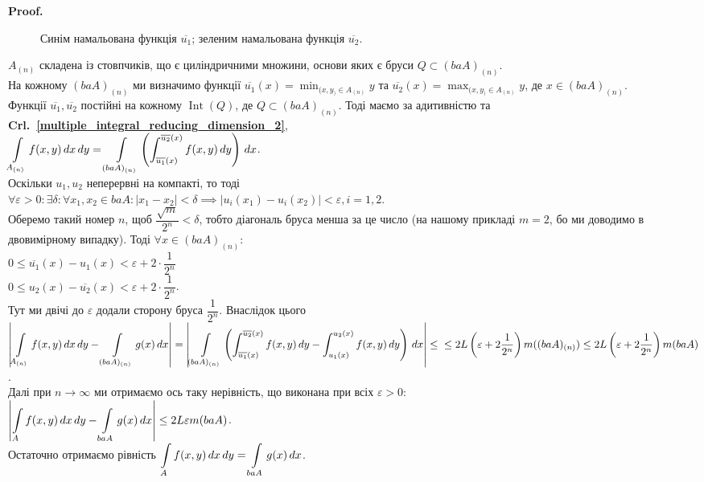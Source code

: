 \documentclass[a4paper, 10pt]{article}
\makeatletter
\def\qed{$\blacksquare$}
\theoremstyle{theoremdd}
\theoremstyle{theoremdd}
\theoremstyle{theoremdd}
\theoremstyle{theoremdd}
\theoremstyle{theoremdd}
\theoremstyle{theoremdd}
\theoremstyle{theoremdd}
\theoremstyle{theoremdd}
\renewenvironment{proof}[1][Proof.\\]{\par
\pushQED{\hfill \qed}%
\normalfont \topsep6\p@\@plus6\p@\relax
\trivlist
\item\relax
{\bfseries
#1\@addpunct{.}}\hspace\labelsep\ignorespaces
}{%
\popQED\endtrivlist\@endpefalse
}
\DeclareMathOperator{\Int}{Int}
\newcommand\crlref[1]{\textbf{Crl.~\ref{#1}}}
\makeatother
\begin{document}
\begin{proof}
\begin{figure}[H]
\caption*{Синім намальована функція $\overline{u_1}$; зеленим намальована функція $\overline{u_2}$.}
\end{figure}
$A_{(n)}$ складена із стовпчиків, що є циліндричними множини, основи яких є бруси $Q \subset (baA)_{(n)}$.\\
На кожному $(baA)_{(n)}$ ми визначимо функції $\overline{u_1}(x) = \displaystyle\min_{(x,y_) \in A_{(n)}} y$ та $\overline{u_2}(x) = \displaystyle\max_{(x,y_) \in A_{(n)}} y$, де $x \in (baA)_{(n)}$.\\
Функції $\overline{u_1}, \overline{u_2}$ постійні на кожному $\Int(Q)$, де $Q \subset (baA)_{(n)}$. Тоді маємо за адитивністю та \crlref{multiple_integral_reducing_dimension_2},\\
$\displaystyle\int\displaylimits_{A_{(n)}} f(x,y)\,dx\,dy = \int\displaylimits_{(baA)_{(n)}} \left(\int_{\overline{u_1}(x)}^{\overline{u_2}(x)} f(x,y)\,dy \right)\,dx$.\\
Оскільки $u_1,u_2$ неперервні на компакті, то тоді\\
$\forall \varepsilon > 0: \exists \delta: \forall x_1,x_2 \in baA: |x_1-x_2| < \delta \implies |u_i(x_1)-u_i(x_2)| < \varepsilon, i =1,2$.\\
Оберемо такий номер $n$, щоб $\dfrac{\sqrt{m}}{2^n} < \delta$, тобто діагональ бруса менша за це число (на нашому прикладі $m =2$, бо ми доводимо в двовимірному випадку). Тоді $\forall x \in (baA)_{(n)}:$\\
$0 \leq \overline{u_1}(x) - u_1(x) < \varepsilon + 2 \cdot \dfrac{1}{2^n}$\\
$0 \leq u_2(x) - \overline{u_2}(x) < \varepsilon + 2 \cdot \dfrac{1}{2^n}$.\\
Тут ми двічі до $\varepsilon$ додали сторону бруса $\dfrac{1}{2^n}$. Внаслідок цього\\
$\displaystyle\abs{\int\displaylimits_{A_{(n)}} f(x,y)\,dx\,dy - \int\displaylimits_{(baA)_{(n)}} g(x)\,dx} = \abs{\int\displaylimits_{(baA)_{(n)}} \left(\int_{\overline{u_1}(x)}^{\overline{u_2}(x)} f(x,y)\,dy- \int_{u_1(x)}^{u_2(x)} f(x,y)\,dy \right)\,dx} \leq \\
\leq 2L\left(\varepsilon + 2 \dfrac{1}{2^n}\right) m((baA)_{(n)}) \leq 2L\left(\varepsilon + 2 \dfrac{1}{2^n}\right) m(baA)$.\\
Далі при $n \to \infty$ ми отримаємо ось таку нерівність, що виконана при всіх $\varepsilon > 0$:\\
$\displaystyle\left| \int\displaylimits_{A} f(x,y)\,dx\,dy - \int\displaylimits_{baA} g(x)\,dx \right| \leq 2L \varepsilon m(baA)$.\\
Остаточно отримаємо рівність $\displaystyle\int\displaylimits_A f(x,y)\,dx\,dy = \int\displaylimits_{baA} g(x)\,dx$.
\end{proof}
\end{document}
